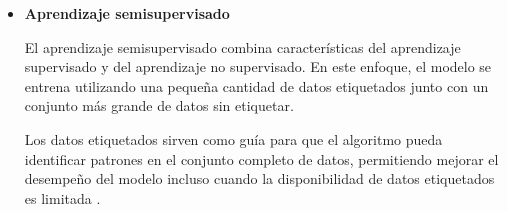 \begin{itemize}
El aprendizaje por refuerzo es un enfoque en el cual un agente aprende a tomar decisiones mediante la interacción con su entorno. Durante el proceso de entrenamiento, el agente realiza acciones y recibe retroalimentación en forma de recompensas o penalizaciones.

El objetivo del algoritmo es aprender una política de acción que maximice la recompensa acumulada a lo largo del tiempo. Este enfoque se utiliza frecuentemente en áreas como robótica, videojuegos y sistemas de navegación autónoma \cite{ibm2025_mltypes}.

\item \textbf{Aprendizaje semisupervisado}

El aprendizaje semisupervisado combina características del aprendizaje supervisado y del aprendizaje no supervisado. En este enfoque, el modelo se entrena utilizando una pequeña cantidad de datos etiquetados junto con un conjunto más grande de datos sin etiquetar.

Los datos etiquetados sirven como guía para que el algoritmo pueda identificar patrones en el conjunto completo de datos, permitiendo mejorar el desempeño del modelo incluso cuando la disponibilidad de datos etiquetados es limitada \cite{ibm2025_mltypes}.

\end{itemize}